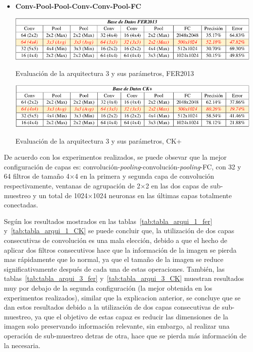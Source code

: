 \begin{itemize}
{}

\item {\textbf{Conv-Pool-Pool-Conv-Conv-Pool-FC}

\begin{table}[H]
    \centering
    \includegraphics[width=140mm]{Imagenes/tabla_arqui_3_fer.png} 
    \caption{Evaluación de la arquitectura 3 y sus parámetros, FER2013}
    \label{tab:tabla_arqui_3_fer}
\end{table}

\begin{table}[H]
    \centering
    \includegraphics[width=140mm]{Imagenes/tabla_arqui_3_CK.png}
    \caption{Evaluación de la arquitectura 3 y sus parámetros, CK+}
    \label{tab:tabla_arqui_3_CK}
\end{table}
}
\end{itemize}

De acuerdo con los experimentos realizados, se puede obsevar que la mejor configuración de capas es: convolución-\textit{pooling}-convolución-\textit{pooling}-FC, con 32 y 64 filtros de tamaño 4$\times$4 en la primera y segunda capa de convolución respectivamente, ventanas de agrupación de 2$\times$2 en las dos capas de sub-muestreo y un total de 1024$\times$1024 neuronas en las últimas capas totalmente conectadas.

Según los resultados mostrados en las tablas~\ref{tab:tabla_arqui_1_fer} y~\ref{tab:tabla_arqui_1_CK} se puede concluir que, la utilización de dos capas consecutivas de convolución es una mala elección, debido a que el hecho de aplicar dos filtros consecutivos hace que la información de la imagen se pierda mas rápidamente que lo normal, ya que el tamaño de la imagen se reduce significativamente después de cada una de estas operaciones. También, las tablas~\ref{tab:tabla_arqui_3_fer} y~\ref{tab:tabla_arqui_3_CK} muestran resultados muy por debajo de la segunda configuración (la mejor obtenida en los experimentos realizados), similar que la explicacion anterior, se concluye que se dan estos resultados debido a la utilización de dos capas consecutivas de sub-muestreo, ya que el objetivo de estas capaz es reducir las dimensiones de la imagen solo preservando información relevante, sin embargo, al realizar una operación de sub-muestreo detras de otra, hace que se pierda más información de la necesaria. 

